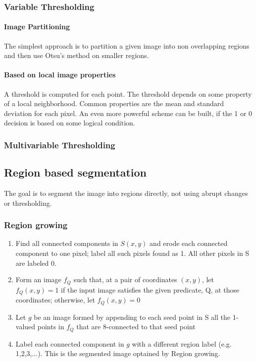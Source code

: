 \subsubsection{Variable Thresholding}
\paragraph{Image Partitioning}
The simplest approach is to partition a given image into non overlapping regions and then use Otsu's method on smaller regions.\\
\paragraph{Based on local image properties}
A threshold is computed for each point. The threshold depends on some property of a local neighborhood. Common properties are the mean and standard deviation for each pixel.
An even more powerful scheme can be built, if the 1 or 0 decision is based on some logical condition.\\
\subsubsection{Multivariable Thresholding}
\subsection{Region based segmentation}
The goal is to segment the image into regions directly, not using abrupt changes or thresholding.
\subsubsection{Region growing}
\begin{enumerate}
\item Find all connected components in $S(x,y)$ and erode each connected component to one pixel; label all such pixels found as 1. All other pixels in S are labeled 0.
\item Form an image $f_Q$ such that, at a pair of coordinates $(x,y)$, let $f_Q(x,y)=1$ if the input image satisfies the given predicate, Q, at those coordinates; otherwise, let $f_Q(x,y)=0$
\item Let $g$ be an image formed by appending to each seed point in S all the 1-valued points in $f_Q$ that are 8-connected to that seed point
\item Label each connected component in $g$ with a different region label (e.g. 1,2,3,...). This is the segmented image optained by Region growing.
\end{enumerate}
